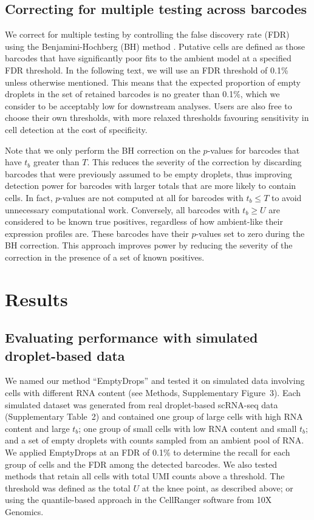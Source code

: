 \documentclass{bmcart}
\newcommand{\supptabdataset}{2}
\newcommand{\suppfigsimdesign}{3}
\begin{document}
\subsection*{Correcting for multiple testing across barcodes}
We correct for multiple testing by controlling the false discovery rate (FDR) using the Benjamini-Hochberg (BH) method \cite{benjamini1995controlling}.
Putative cells are defined as those barcodes that have significantly poor fits to the ambient model at a specified FDR threshold.
In the following text, we will use an FDR threshold of 0.1\% unless otherwise mentioned.
This means that the expected proportion of empty droplets in the set of retained barcodes is no greater than 0.1\%,
which we consider to be acceptably low for downstream analyses.
Users are also free to choose their own thresholds, with more relaxed thresholds favouring sensitivity in cell detection at the cost of specificity.

Note that we only perform the BH correction on the $p$-values for barcodes that have $t_b$ greater than $T$.
This reduces the severity of the correction by discarding barcodes that were previously assumed to be empty droplets, thus improving detection power for barcodes with larger totals that are more likely to contain cells.
In fact, $p$-values are not computed at all for barcodes with $t_b \le T$ to avoid unnecessary computational work.
Conversely, all barcodes with $t_b \ge U$ are considered to be known true positives, regardless of how ambient-like their expression profiles are.
These barcodes have their $p$-values set to zero during the BH correction.
This approach improves power by reducing the severity of the correction in the presence of a set of known positives.

\section*{Results}

\subsection*{Evaluating performance with simulated droplet-based data}
We named our method ``EmptyDrops'' and tested it on simulated data involving cells with different RNA content (see Methods, Supplementary Figure~\suppfigsimdesign{}).
Each simulated dataset was generated from real droplet-based scRNA-seq data (Supplementary Table~\supptabdataset{}) 
and contained one group of large cells with high RNA content and large $t_b$;
one group of small cells with low RNA content and small $t_b$; 
and a set of empty droplets with counts sampled from an ambient pool of RNA.
We applied EmptyDrops at an FDR of 0.1\% to determine the recall for each group of cells and the FDR among the detected barcodes.
We also tested methods that retain all cells with total UMI counts above a threshold.
The threshold was defined as the total $U$ at the knee point, as described above;
or using the quantile-based approach \cite{zheng2017massively} in the CellRanger software from 10X Genomics.
\end{document}
